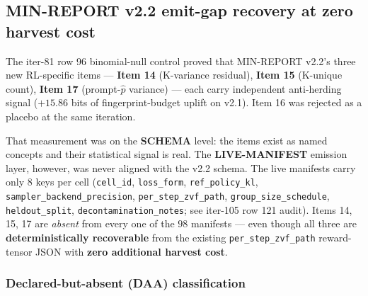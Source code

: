 \subsection{MIN-REPORT v2.2 emit-gap recovery at zero harvest cost}
\label{sec:p5-iter113-v22-recovery}

The iter-81 row 96 binomial-null control proved that MIN-REPORT v2.2's
three new RL-specific items --- \textbf{Item 14} (K-variance residual),
\textbf{Item 15} (K-unique count), \textbf{Item 17} (prompt-$\hat p$
variance) --- each carry independent anti-herding signal ($+15.86$ bits
of fingerprint-budget uplift on v2.1). Item 16 was rejected as a placebo
at the same iteration.

That measurement was on the \textbf{SCHEMA} level: the items exist as
named concepts and their statistical signal is real. The
\textbf{LIVE-MANIFEST} emission layer, however, was never aligned with
the v2.2 schema. The live manifests carry only $8$ keys per cell
(\texttt{cell\_id}, \texttt{loss\_form}, \texttt{ref\_policy\_kl},
\texttt{sampler\_backend\_precision}, \texttt{per\_step\_zvf\_path},
\texttt{group\_size\_schedule}, \texttt{heldout\_split},
\texttt{decontamination\_notes}; see iter-105 row 121 audit). Items 14,
15, 17 are \emph{absent} from every one of the $98$ manifests --- even
though all three are \textbf{deterministically recoverable} from the
existing \texttt{per\_step\_zvf\_path} reward-tensor JSON with
\textbf{zero additional harvest cost}.

\subsubsection{Declared-but-absent (DAA) classification}

